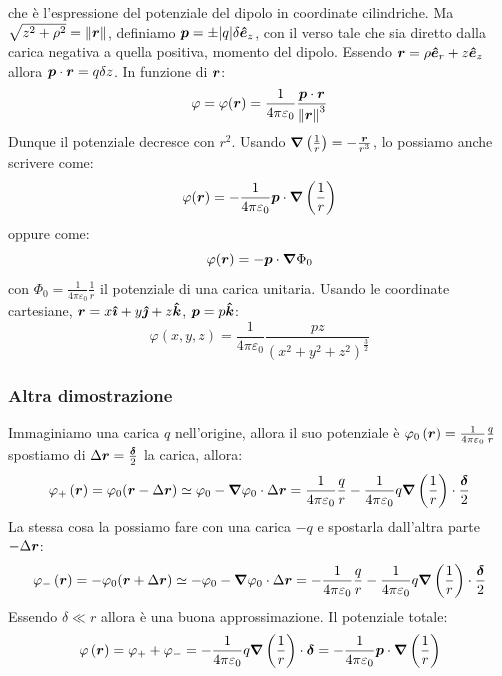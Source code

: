 che è l'espressione del potenziale del dipolo in coordinate cilindriche. Ma $\sqrt{z^2+\rho^2}=\left\lVert\boldsymbol{r}\right\rVert$, definiamo $\boldsymbol{p}=\pm |q|\delta \boldsymbol{\hat {e}}_z$, con il verso tale che sia diretto dalla carica negativa a quella positiva, momento del dipolo. Essendo $\boldsymbol{r}=\rho\boldsymbol{\hat {e}}_r+z\boldsymbol{\hat {e}}_z$ allora $\boldsymbol{p}\cdot\boldsymbol{r}=q\delta z$. In funzione di $\boldsymbol{r}$:
\[\varphi=\varphi(\boldsymbol{r})=\frac{1}{4\pi\varepsilon_0}\frac{\boldsymbol{p}\cdot\boldsymbol{r}}{{\left\lVert\boldsymbol{r}\right\rVert}^3}\]
Dunque il potenziale decresce con $r^2$. Usando $\boldsymbol{\nabla}\left(\frac{1}{r}\right)=-\frac{\boldsymbol{r}}{r^3}$, lo possiamo anche scrivere come:
\begin{equation}
  \varphi(\boldsymbol{r})=-\frac{1}{4\pi\varepsilon_0}\boldsymbol{p}\cdot\boldsymbol{\nabla}\left(\frac{1}{r}\right)
\end{equation}
oppure come:
\begin{equation}
  \varphi(\boldsymbol{r})=-\boldsymbol{p}\cdot\boldsymbol{\nabla}\Phi_0
\end{equation}
con $\Phi_0=\frac{1}{4\pi\varepsilon_0}\frac{1}{r}$ il potenziale di una carica unitaria. Usando le coordinate cartesiane, $\boldsymbol{r}=x\boldsymbol{\hat {\imath}}+y\boldsymbol{\hat {\jmath}}+z\boldsymbol{\hat {k}}$, $\boldsymbol{p}=p\boldsymbol{\hat {k}}$:
\begin{equation}
  \varphi(x,y,z)=\frac{1}{4\pi\varepsilon_0}\frac{pz}{\left(x^2+y^2+z^2\right)^\frac{3}{2}}
\end{equation}
\subsubsection{Altra dimostrazione}
Immaginiamo una carica $q$ nell'origine, allora il suo potenziale è $\varphi_0\left(\boldsymbol{r}\right)=\frac{1}{4\pi\varepsilon_0}\frac{q}{r}$
spostiamo di $\Delta\boldsymbol{r}=\frac{\boldsymbol{\delta}}{2}$ la carica, allora:
\[\varphi_+\left(\boldsymbol{r}\right)=\varphi_0(\boldsymbol{r}-\Delta \boldsymbol{r})\simeq\varphi_0-\boldsymbol{\nabla}\varphi_0\cdot\Delta\boldsymbol{r}=\frac{1}{4\pi\varepsilon_0}\frac{q}{r}-\frac{1}{4\pi\varepsilon_0}q\boldsymbol{\nabla}\left(\frac{1}{r}\right)\cdot\frac{\boldsymbol{\delta}}{2}\]
La stessa cosa la possiamo fare con una carica $-q$ e spostarla dall'altra parte $-\Delta\boldsymbol{r}$:
\[\varphi_-\left(\boldsymbol{r}\right)=-\varphi_0(\boldsymbol{r}+\Delta \boldsymbol{r})\simeq-\varphi_0-\boldsymbol{\nabla}\varphi_0\cdot\Delta\boldsymbol{r}=-\frac{1}{4\pi\varepsilon_0}\frac{q}{r}-\frac{1}{4\pi\varepsilon_0}q\boldsymbol{\nabla}\left(\frac{1}{r}\right)\cdot\frac{\boldsymbol{\delta}}{2}\]
Essendo $\delta\ll r$ allora è una buona approssimazione. Il potenziale totale:
\[\varphi\left(\boldsymbol{r}\right)=\varphi_++\varphi_-=-\frac{1}{4\pi\varepsilon_0}q\boldsymbol{\nabla}\left(\frac{1}{r}\right)\cdot\boldsymbol{\delta}=-\frac{1}{4\pi\varepsilon_0}\boldsymbol{p}\cdot\boldsymbol{\nabla}\left(\frac{1}{r}\right)\]


